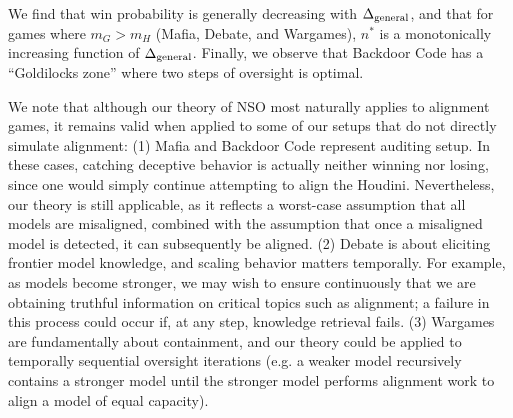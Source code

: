 \documentclass{article}
\begin{document}
We find that win probability is generally decreasing with $\Delta_{\rm general}$, and that for games where $m_G>m_H$ (Mafia, Debate, and Wargames), $n^*$ is a monotonically increasing function of $\Delta_{\rm general}$. Finally, we observe that Backdoor Code has a ``Goldilocks zone'' where two steps of oversight is optimal.

We note that although our theory of NSO most naturally applies to alignment games, it remains valid when applied to some of our setups that do not directly simulate alignment: (1) Mafia and Backdoor Code represent auditing setup. In these cases, catching deceptive behavior is actually neither winning nor losing, since one would simply continue attempting to align the Houdini. Nevertheless, our theory is still applicable, as it reflects a worst-case assumption that all models are misaligned, combined with the assumption that once a misaligned model is detected, it can subsequently be aligned. (2) Debate is about eliciting frontier model knowledge, and scaling behavior matters temporally. For example, as models become stronger, we may wish to ensure continuously that we are obtaining truthful information on critical topics such as alignment; a failure in this process could occur if, at any step, knowledge retrieval fails. (3) Wargames are fundamentally about containment, and our theory could be applied to temporally sequential oversight iterations (e.g. a weaker model recursively contains a stronger model until the stronger model performs alignment work to align a model of equal capacity).




\end{document}

